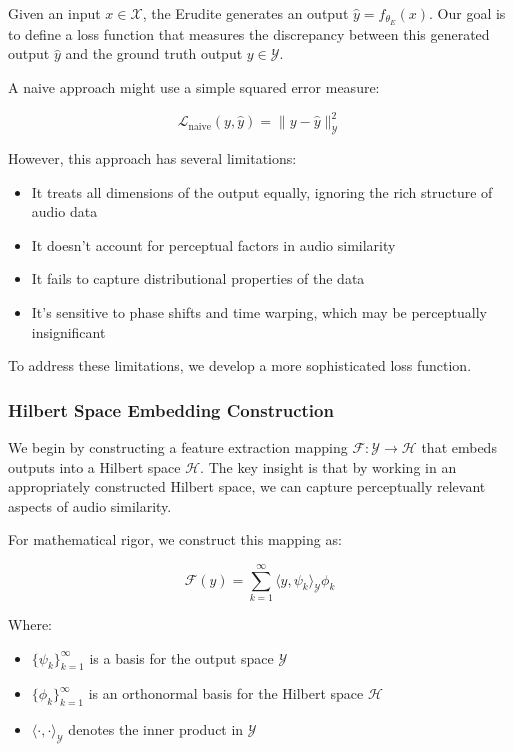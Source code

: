 Given an input $x \in \mathcal{X}$, the Erudite generates an output $\hat{y} = f_{\theta_E}(x)$. Our goal is to define a loss function that measures the discrepancy between this generated output $\hat{y}$ and the ground truth output $y \in \mathcal{Y}$.

A naive approach might use a simple squared error measure:

\begin{equation}
\mathcal{L}_{\text{naive}}(y, \hat{y}) = \|y - \hat{y}\|_{\mathcal{Y}}^2
\end{equation}

However, this approach has several limitations:

\begin{itemize}
\item It treats all dimensions of the output equally, ignoring the rich structure of audio data
\item It doesn't account for perceptual factors in audio similarity
\item It fails to capture distributional properties of the data
\item It's sensitive to phase shifts and time warping, which may be perceptually insignificant
\end{itemize}

To address these limitations, we develop a more sophisticated loss function.

\subsubsection{Hilbert Space Embedding Construction}

We begin by constructing a feature extraction mapping $\mathcal{F}: \mathcal{Y} \rightarrow \mathcal{H}$ that embeds outputs into a Hilbert space $\mathcal{H}$. The key insight is that by working in an appropriately constructed Hilbert space, we can capture perceptually relevant aspects of audio similarity.

For mathematical rigor, we construct this mapping as:

\begin{equation}
\mathcal{F}(y) = \sum_{k=1}^{\infty} \langle y, \psi_k \rangle_{\mathcal{Y}} \phi_k
\end{equation}

Where:
\begin{itemize}
\item $\{\psi_k\}_{k=1}^{\infty}$ is a basis for the output space $\mathcal{Y}$
\item $\{\phi_k\}_{k=1}^{\infty}$ is an orthonormal basis for the Hilbert space $\mathcal{H}$
\item $\langle \cdot, \cdot \rangle_{\mathcal{Y}}$ denotes the inner product in $\mathcal{Y}$
\end{itemize}

